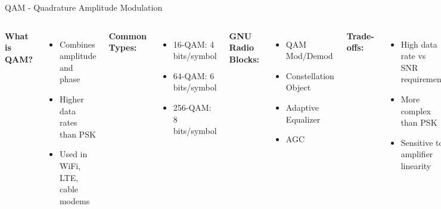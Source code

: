 \documentclass[aspectratio=169,11pt]{beamer}
\begin{document}
\begin{frame}{QAM - Quadrature Amplitude Modulation}
\begin{columns}
\textbf{What is QAM?}
\begin{itemize}
    \item Combines amplitude and phase
    \item Higher data rates than PSK
    \item Used in WiFi, LTE, cable modems
\end{itemize}

\vspace{0.3cm}
\textbf{Common Types:}
\begin{itemize}
    \item 16-QAM: 4 bits/symbol
    \item 64-QAM: 6 bits/symbol
    \item 256-QAM: 8 bits/symbol
\end{itemize}

\textbf{GNU Radio Blocks:}
\begin{itemize}
    \item QAM Mod/Demod
    \item Constellation Object
    \item Adaptive Equalizer
    \item AGC
\end{itemize}

\vspace{0.3cm}
\textbf{Trade-offs:}
\begin{itemize}
    \item High data rate vs SNR requirement
    \item More complex than PSK
    \item Sensitive to amplifier linearity
\end{itemize}
\end{columns}
\end{frame}
\end{document}

